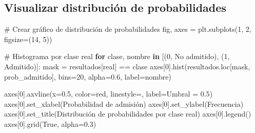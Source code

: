 \documentclass[
  doc,
  floatsintext,
  longtable,
  a4paper,
  nolmodern,
  notxfonts,
  notimes,
  12pt,
  colorlinks=true,linkcolor=blue,citecolor=blue,urlcolor=blue]{apa7}
\newenvironment{Shaded}{\begin{snugshade}}{\end{snugshade}}
\newcommand{\CommentTok}[1]{\textcolor[rgb]{0.37,0.37,0.37}{#1}}
\newcommand{\ControlFlowTok}[1]{\textcolor[rgb]{0.00,0.23,0.31}{\textbf{#1}}}
\newcommand{\DecValTok}[1]{\textcolor[rgb]{0.68,0.00,0.00}{#1}}
\newcommand{\FloatTok}[1]{\textcolor[rgb]{0.68,0.00,0.00}{#1}}
\newcommand{\KeywordTok}[1]{\textcolor[rgb]{0.00,0.23,0.31}{\textbf{#1}}}
\newcommand{\NormalTok}[1]{\textcolor[rgb]{0.00,0.23,0.31}{#1}}
\newcommand{\OperatorTok}[1]{\textcolor[rgb]{0.37,0.37,0.37}{#1}}
\newcommand{\StringTok}[1]{\textcolor[rgb]{0.13,0.47,0.30}{#1}}
\newcommand{\VariableTok}[1]{\textcolor[rgb]{0.07,0.07,0.07}{#1}}
\begin{document}
\subsection{Visualizar distribución de
probabilidades}\label{visualizar-distribuciuxf3n-de-probabilidades}

\begin{Shaded}
\begin{Highlighting}[]
\CommentTok{\# Crear gráfico de distribución de probabilidades}
\NormalTok{fig, axes }\OperatorTok{=}\NormalTok{ plt.subplots(}\DecValTok{1}\NormalTok{, }\DecValTok{2}\NormalTok{, figsize}\OperatorTok{=}\NormalTok{(}\DecValTok{14}\NormalTok{, }\DecValTok{5}\NormalTok{))}

\CommentTok{\# Histograma por clase real}
\ControlFlowTok{for}\NormalTok{ clase, nombre }\KeywordTok{in}\NormalTok{ [(}\DecValTok{0}\NormalTok{, }\StringTok{\textquotesingle{}No admitido\textquotesingle{}}\NormalTok{), (}\DecValTok{1}\NormalTok{, }\StringTok{\textquotesingle{}Admitido\textquotesingle{}}\NormalTok{)]:}
\NormalTok{    mask }\OperatorTok{=}\NormalTok{ resultados[}\StringTok{\textquotesingle{}real\textquotesingle{}}\NormalTok{] }\OperatorTok{==}\NormalTok{ clase}
\NormalTok{    axes[}\DecValTok{0}\NormalTok{].hist(resultados.loc[mask, }\StringTok{\textquotesingle{}prob\_admitido\textquotesingle{}}\NormalTok{], }
\NormalTok{                 bins}\OperatorTok{=}\DecValTok{20}\NormalTok{, alpha}\OperatorTok{=}\FloatTok{0.6}\NormalTok{, label}\OperatorTok{=}\NormalTok{nombre)}

\NormalTok{axes[}\DecValTok{0}\NormalTok{].axvline(x}\OperatorTok{=}\FloatTok{0.5}\NormalTok{, color}\OperatorTok{=}\StringTok{\textquotesingle{}red\textquotesingle{}}\NormalTok{, linestyle}\OperatorTok{=}\StringTok{\textquotesingle{}{-}{-}\textquotesingle{}}\NormalTok{, label}\OperatorTok{=}\StringTok{\textquotesingle{}Umbral = 0.5\textquotesingle{}}\NormalTok{)}
\NormalTok{axes[}\DecValTok{0}\NormalTok{].set\_xlabel(}\StringTok{\textquotesingle{}Probabilidad de admisión\textquotesingle{}}\NormalTok{)}
\NormalTok{axes[}\DecValTok{0}\NormalTok{].set\_ylabel(}\StringTok{\textquotesingle{}Frecuencia\textquotesingle{}}\NormalTok{)}
\NormalTok{axes[}\DecValTok{0}\NormalTok{].set\_title(}\StringTok{\textquotesingle{}Distribución de probabilidades por clase real\textquotesingle{}}\NormalTok{)}
\NormalTok{axes[}\DecValTok{0}\NormalTok{].legend()}
\NormalTok{axes[}\DecValTok{0}\NormalTok{].grid(}\VariableTok{True}\NormalTok{, alpha}\OperatorTok{=}\FloatTok{0.3}\NormalTok{)}


\end{Highlighting}
\end{Shaded}
\end{document}

